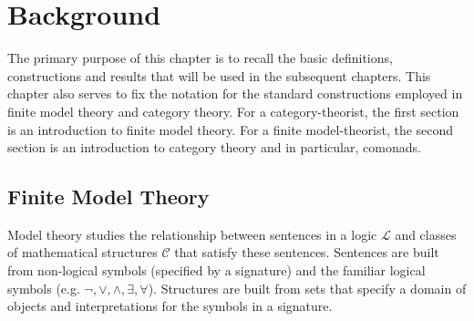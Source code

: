 \chapter{Background}
The primary purpose of this chapter is to recall the basic definitions, constructions and results that will be used in the subsequent chapters. This chapter also serves to fix the notation for the standard constructions employed in finite model theory and category theory. For a category-theorist, the first section is an introduction to finite model theory. For a finite model-theorist, the second section is an introduction to category theory and in particular, comonads.   
\section{Finite Model Theory}
Model theory studies the relationship between sentences in a logic $\mathcal{L}$ and classes of mathematical structures $\mathcal{C}$ that satisfy these sentences. Sentences are built from non-logical symbols (specified by a signature) and the familiar logical symbols (e.g. $\neg,\vee,\wedge,\exists,\forall$). Structures are built from sets that specify a domain of objects and interpretations for the symbols in a signature.
